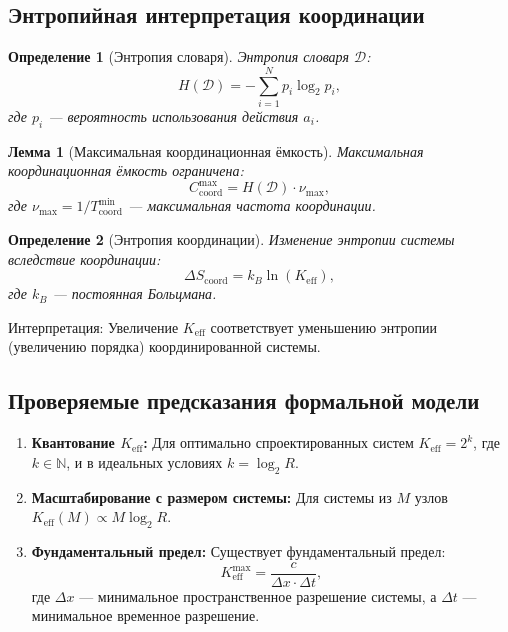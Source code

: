 \documentclass[12pt]{article}
\newtheorem{definition}{Определение}
\newtheorem{lemma}{Лемма}
\begin{document}
	\subsection{Энтропийная интерпретация координации}
	\label{app:entropy}
	
	\begin{definition}[Энтропия словаря]
		Энтропия словаря $\mathcal{D}$:
		\[
		H(\mathcal{D}) = - \sum_{i=1}^{N} p_i \log_2 p_i,
		\]
		где $p_i$ — вероятность использования действия $a_i$.
	\end{definition}
	
	\begin{lemma}[Максимальная координационная ёмкость]
		Максимальная координационная ёмкость ограничена:
		\[
		C_{\text{coord}}^{\text{max}} = H(\mathcal{D}) \cdot \nu_{\text{max}},
		\]
		где $\nu_{\text{max}} = 1 / T_{\text{coord}}^{\text{min}}$ — максимальная частота координации.
	\end{lemma}
	
	\begin{definition}[Энтропия координации]
		Изменение энтропии системы вследствие координации:
		\[
		\Delta S_{\text{coord}} = k_B \ln(K_{\mathrm{eff}}),
		\]
		где $k_B$ — постоянная Больцмана.
	\end{definition}
	
	Интерпретация: Увеличение $K_{\mathrm{eff}}$ соответствует уменьшению энтропии (увеличению порядка) координированной системы.
	
	\subsection{Проверяемые предсказания формальной модели}
	\label{app:predictions}
	
	\begin{enumerate}
		\item \textbf{Квантование $K_{\mathrm{eff}}$:} Для оптимально спроектированных систем $K_{\mathrm{eff}} = 2^k$, где $k \in \mathbb{N}$, и в идеальных условиях $k = \log_2 R$.
		
		\item \textbf{Масштабирование с размером системы:} Для системы из $M$ узлов $K_{\mathrm{eff}}(M) \propto M \log_2 R$.
		
		\item \textbf{Фундаментальный предел:} Существует фундаментальный предел:
		\[
		K_{\mathrm{eff}}^{\text{max}} = \frac{c}{\Delta x \cdot \Delta t},
		\]
		где $\Delta x$ — минимальное пространственное разрешение системы, а $\Delta t$ — минимальное временное разрешение.
	\end{enumerate}
	
\end{document}
